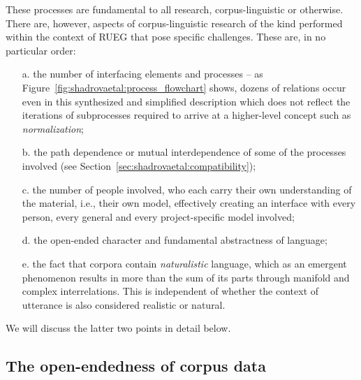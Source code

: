 \documentclass[output=paper,colorlinks,citecolor=brown]{langscibook}
\begin{document}
These processes are fundamental to all research, corpus-linguistic or otherwise. There are, however, aspects of corpus-linguistic research of the kind performed within the context of RUEG that pose specific challenges. These are, in no particular order:

\begin{enumerate}
    \item[a.] the number of interfacing elements and processes -- as Figure~\ref{fig:shadrovaetal:process_flowchart} shows, dozens of relations occur even in this synthesized and simplified description which does not reflect the iterations of subprocesses required to arrive at a higher-level concept such as \textit{normalization};
    \item[b.] the path dependence or mutual interdependence of some of the processes involved (see Section~\ref{sec:shadrovaetal:compatibility}); 
    \item[c.] the number of people involved, who each carry their own understanding of the material, i.e., their own model, effectively creating an interface with every person, every general and every project-specific  model involved;
    \item[d.] the open-ended character and fundamental abstractness of language;
    \item[e.] the fact that corpora contain \textit{naturalistic} language, which as an emergent phenomenon results in more than the sum of its parts through manifold and complex interrelations. This is independent of whether the context of utterance is also considered realistic or natural.
\end{enumerate}
We will discuss the latter two points in detail below.

\subsection{The open-endedness of corpus data}
\end{document}

